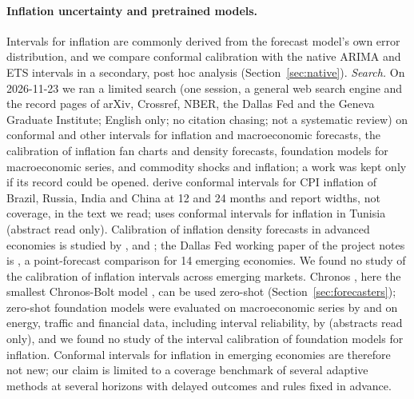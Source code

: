 \paragraph{Inflation uncertainty and pretrained models.} Intervals for inflation are commonly derived from the forecast model's own error distribution, and we compare conformal calibration with the native ARIMA and ETS intervals in a secondary, post hoc analysis (Section~\ref{sec:native}). \emph{Search.} On 2026-11-23 we ran a limited search (one session, a general web search engine and the record pages of arXiv, Crossref, NBER, the Dallas Fed and the Geneva Graduate Institute; English only; no citation chasing; not a systematic review) on conformal and other intervals for inflation and macroeconomic forecasts, the calibration of inflation fan charts and density forecasts, foundation models for macroeconomic series, and commodity shocks and inflation; a work was kept only if its record could be opened. \citet{sengupta2025fewnet} derive conformal intervals for CPI inflation of Brazil, Russia, India and China at 12 and 24 months and report widths, not coverage, in the text we read; \citet{brahem2026tunisia} uses conformal intervals for inflation in Tunisia (abstract read only). Calibration of inflation density forecasts in advanced economies is studied by \citet{diebold1997spf}, \citet{wallis2003fancharts} and \citet{clements2004boe}; the Dallas Fed working paper of the project notes is \citet{duncan2019emerging}, a point-forecast comparison for 14 emerging economies. We found no study of the calibration of inflation intervals across emerging markets. Chronos \citep{ansari2024chronos}, here the smallest Chronos-Bolt model \citep{amazon2024chronosbolt}, can be used zero-shot (Section~\ref{sec:forecasters}); zero-shot foundation models were evaluated on macroeconomic series by \citet{jetwiriyanon2025zeroshot} and on energy, traffic and financial data, including interval reliability, by \citet{michael2026tsfm} (abstracts read only), and we found no study of the interval calibration of foundation models for inflation. Conformal intervals for inflation in emerging economies are therefore not new; our claim is limited to a coverage benchmark of several adaptive methods at several horizons with delayed outcomes and rules fixed in advance.
